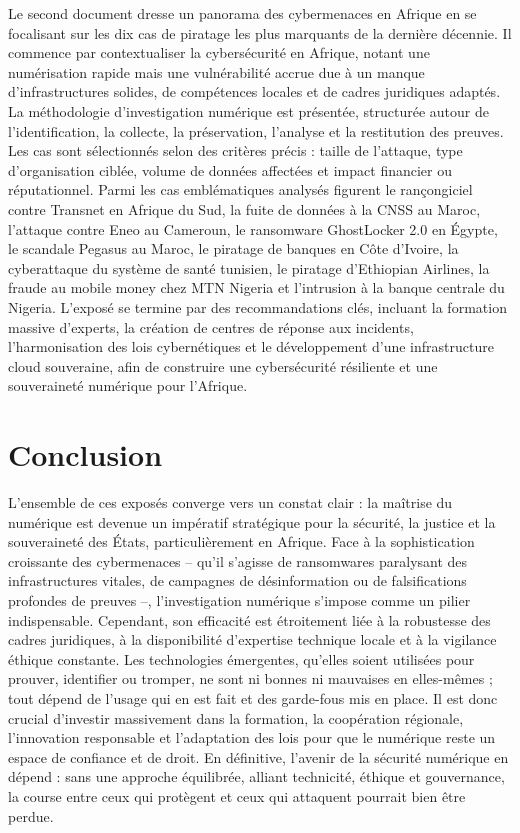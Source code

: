 \documentclass[11pt,a4paper]{article}
\begin{document}
		Le second document dresse un panorama des cybermenaces en Afrique en se focalisant sur les dix cas de piratage les plus marquants de la dernière décennie. Il commence par contextualiser la cybersécurité en Afrique, notant une numérisation rapide mais une vulnérabilité accrue due à un manque d’infrastructures solides, de compétences locales et de cadres juridiques adaptés. La méthodologie d’investigation numérique est présentée, structurée autour de l’identification, la collecte, la préservation, l’analyse et la restitution des preuves. Les cas sont sélectionnés selon des critères précis : taille de l’attaque, type d’organisation ciblée, volume de données affectées et impact financier ou réputationnel. Parmi les cas emblématiques analysés figurent le rançongiciel contre Transnet en Afrique du Sud, la fuite de données à la CNSS au Maroc, l’attaque contre Eneo au Cameroun, le ransomware GhostLocker 2.0 en Égypte, le scandale Pegasus au Maroc, le piratage de banques en Côte d’Ivoire, la cyberattaque du système de santé tunisien, le piratage d’Ethiopian Airlines, la fraude au mobile money chez MTN Nigeria et l’intrusion à la banque centrale du Nigeria. L’exposé se termine par des recommandations clés, incluant la formation massive d’experts, la création de centres de réponse aux incidents, l’harmonisation des lois cybernétiques et le développement d’une infrastructure cloud souveraine, afin de construire une cybersécurité résiliente et une souveraineté numérique pour l’Afrique.
	\newpage
	
	\section*{\Huge Conclusion}
	\vspace{0.5cm}
	L’ensemble de ces exposés converge vers un constat clair : la maîtrise du numérique est devenue un impératif stratégique pour la sécurité, la justice et la souveraineté des États, particulièrement en Afrique. Face à la sophistication croissante des cybermenaces – qu’il s’agisse de ransomwares paralysant des infrastructures vitales, de campagnes de désinformation ou de falsifications profondes de preuves –, l’investigation numérique s’impose comme un pilier indispensable. Cependant, son efficacité est étroitement liée à la robustesse des cadres juridiques, à la disponibilité d’expertise technique locale et à la vigilance éthique constante. Les technologies émergentes, qu’elles soient utilisées pour prouver, identifier ou tromper, ne sont ni bonnes ni mauvaises en elles-mêmes ; tout dépend de l’usage qui en est fait et des garde-fous mis en place. Il est donc crucial d’investir massivement dans la formation, la coopération régionale, l’innovation responsable et l’adaptation des lois pour que le numérique reste un espace de confiance et de droit. En définitive, l’avenir de la sécurité numérique en dépend : sans une approche équilibrée, alliant technicité, éthique et gouvernance, la course entre ceux qui protègent et ceux qui attaquent pourrait bien être perdue.
	
	
\end{document}
